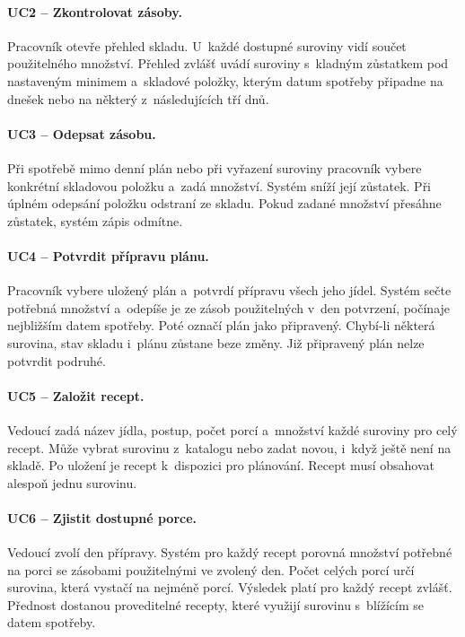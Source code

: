 \documentclass[11pt,a4paper,oneside]{report}
\begin{document}
\paragraph{UC2 -- Zkontrolovat zásoby.}
Pracovník otevře přehled skladu. U~každé dostupné suroviny vidí součet
použitelného množství. Přehled zvlášť uvádí suroviny s~kladným zůstatkem
pod nastaveným minimem a~skladové položky, kterým datum spotřeby
připadne na dnešek nebo na některý z~následujících tří dnů.

\paragraph{UC3 -- Odepsat zásobu.}
Při spotřebě mimo denní plán nebo při vyřazení suroviny pracovník vybere
konkrétní skladovou položku a~zadá množství. Systém sníží její zůstatek.
Při úplném odepsání položku odstraní ze skladu. Pokud zadané množství
přesáhne zůstatek, systém zápis odmítne.

\paragraph{UC4 -- Potvrdit přípravu plánu.}
Pracovník vybere uložený plán a~potvrdí přípravu všech jeho jídel.
Systém sečte potřebná množství a~odepíše je ze zásob použitelných
v~den potvrzení, počínaje nejbližším datem spotřeby. Poté označí plán
jako připravený. Chybí-li některá surovina, stav skladu i~plánu zůstane
beze změny. Již připravený plán nelze potvrdit podruhé.

\paragraph{UC5 -- Založit recept.}
Vedoucí zadá název jídla, postup, počet porcí a~množství každé suroviny
pro celý recept. Může vybrat surovinu z~katalogu nebo zadat novou,
i~když ještě není na skladě. Po uložení je recept k~dispozici pro plánování.
Recept musí obsahovat alespoň jednu surovinu.

\paragraph{UC6 -- Zjistit dostupné porce.}
Vedoucí zvolí den přípravy. Systém pro každý recept porovná množství
potřebné na porci se zásobami použitelnými ve zvolený den. Počet celých
porcí určí surovina, která vystačí na nejméně porcí. Výsledek platí
pro každý recept zvlášť. Přednost dostanou proveditelné recepty,
které využijí surovinu s~blížícím se datem spotřeby.
\end{document}
